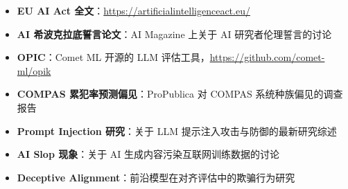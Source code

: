 \begin{itemize}
    \item \textbf{EU AI Act 全文}：\url{https://artificialintelligenceact.eu/}
    \item \textbf{AI 希波克拉底誓言论文}：AI Magazine 上关于 AI 研究者伦理誓言的讨论
    \item \textbf{OPIC}：Comet ML 开源的 LLM 评估工具，\url{https://github.com/comet-ml/opik}
    \item \textbf{COMPAS 累犯率预测偏见}：ProPublica 对 COMPAS 系统种族偏见的调查报告
    \item \textbf{Prompt Injection 研究}：关于 LLM 提示注入攻击与防御的最新研究综述
    \item \textbf{AI Slop 现象}：关于 AI 生成内容污染互联网训练数据的讨论
    \item \textbf{Deceptive Alignment}：前沿模型在对齐评估中的欺骗行为研究
\end{itemize}



